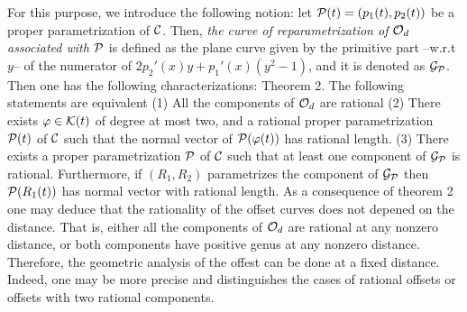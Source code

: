 For this purpose,  we introduce the 
following notion: let ${\cal P}(t)=(p_{1}(t),p_{2}(t))$ be a proper 
parametrization of ${\cal C}$. Then, {\it the curve of reparametrization of 
${\cal O}_{d}$  associated with ${\cal P}$} is defined as the plane curve 
given by the primitive part --w.r.t $y$-- of the  numerator of 
$2p_{2}'(x)y+p_{1}'(x)(y^{2}-1)$, and it is denoted as 
${\cal G}_{{\cal P}}$. Then one has the following characterizations:
\vspace{1 mm}
\newline
{\sc Theorem 2.}  The following statements are equivalent 
\vspace{1 mm}
\newline
\hspace*{8 mm} 
(1) All the components of ${\cal O}_{d}$ are rational 
\vspace{1 mm}
\newline
\hspace*{8 mm} 
(2) There exists  $\varphi \in {\cal K}(t)$ of degree at most two, 
and a rational proper parametrization ${\cal P}(t)$ of 
\newline
\hspace*{13 mm} 
${\cal C}$ such that the normal vector of ${\cal P}(\varphi(t))$ has 
rational length.
\vspace{1 mm}
\newline
\hspace*{8 mm} 
(3) There exists a  proper parametrization ${\cal P}$  of ${\cal C}$ 
such that  at least one component of ${\cal G}_{{\cal P}}$ is 
\newline
\hspace*{13 mm} rational. Furthermore, if $(R_{1},R_{2})$ parametrizes 
the component of ${\cal G}_{{\cal P}}$ then ${\cal P}(R_{1}(t))$ has 
\newline
\hspace*{13 mm} normal vector with rational length.
\vspace{2 mm}
\newline
As a consequence of theorem 2  one may deduce that the rationality of the 
offset curves does not depened on the distance. That is, either all the 
components of ${\cal O}_{d}$ are rational at any  nonzero distance,  or  
both components have positive genus  at any  nonzero distance. Therefore, 
the geometric analysis of the offest can be done at a fixed distance. 
Indeed, one may be more precise and distinguishes the cases of rational 
offsets or offsets with two rational components.
\vspace{1 mm}

